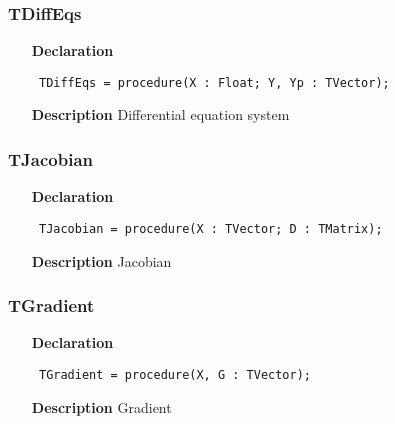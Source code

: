 \documentclass[12pt,a4paper,oneside]{report}
\newcommand{\declarationitem}[1]{\textbf{#1}}
\newcommand{\descriptiontitle}[1]{\textbf{#1}}
\newcommand{\code}[1]{\texttt{#1}}
\begin{document}
\subsubsection{TDiffEqs}
\label{utypes-TDiffEqs}
\begin{itemize}\item[\declarationitem{Declaration}\hfill]
	\begin{flushleft}
		\code{
			TDiffEqs = procedure(X : Float; Y, Yp : TVector);}
		
	\end{flushleft}
	
	\par
	\item[\descriptiontitle{Description}]
	Differential equation system
	
\end{itemize}
\subsubsection{TJacobian}
\label{utypes-TJacobian}
\begin{itemize}\item[\declarationitem{Declaration}\hfill]
	\begin{flushleft}
		\code{
			TJacobian = procedure(X : TVector; D : TMatrix);}
		
	\end{flushleft}
	
	\par
	\item[\descriptiontitle{Description}]
	Jacobian
	
\end{itemize}
\subsubsection{TGradient}
\label{utypes-TGradient}
\begin{itemize}\item[\declarationitem{Declaration}\hfill]
	\begin{flushleft}
		\code{
			TGradient = procedure(X, G : TVector);}
		
	\end{flushleft}
	
	\par
	\item[\descriptiontitle{Description}]
	Gradient
	
\end{itemize}
\end{document}
